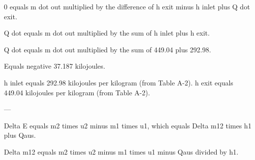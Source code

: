 0 equals m dot out multiplied by the difference of h exit minus h inlet plus Q dot exit.  

Q dot equals m dot out multiplied by the sum of h inlet plus h exit.  

Q dot equals m dot out multiplied by the sum of 449.04 plus 292.98.  

Equals negative 37.187 kilojoules.  

h inlet equals 292.98 kilojoules per kilogram (from Table A-2).  
h exit equals 449.04 kilojoules per kilogram (from Table A-2).  

---

Delta E equals m2 times u2 minus m1 times u1, which equals Delta m12 times h1 plus Qaus.  

Delta m12 equals m2 times u2 minus m1 times u1 minus Qaus divided by h1.